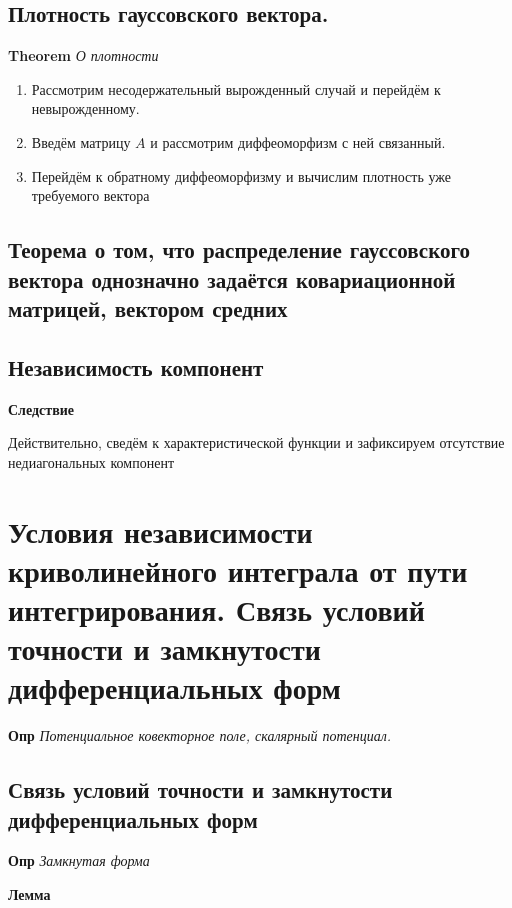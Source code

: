 \documentclass[a4paper, 14pt]{article}
\begin{document}
    \subsection{Плотность гауссовского вектора.}
    
    \textbf{Theorem} \textit{О плотности}
    
    \begin{enumerate}
        \item Рассмотрим несодержательный вырожденный случай и перейдём к невырожденному.
        \item Введём матрицу $A$ и рассмотрим диффеоморфизм с ней связанный.
        \item Перейдём к обратному диффеоморфизму и вычислим плотность уже требуемого вектора
    \end{enumerate}
    
    \subsection{Теорема о том, что распределение гауссовского вектора однозначно задаётся ковариационной матрицей,
        вектором средних}
    
    \subsection{Независимость компонент}
    
    \textbf{Следствие}
    
    Действительно, сведём к характеристической функции и зафиксируем отсутствие недиагональных компонент
    
    \section{Условия независимости криволинейного интеграла от пути интегрирования.
    Связь условий точности и замкнутости дифференциальных форм}
    
    \textbf{Опр} \textit{Потенциальное ковекторное поле, скалярный потенциал.}
    
    \subsection{Связь условий точности и замкнутости дифференциальных форм}
    
    \textbf{Опр} \textit{Замкнутая форма}
    
    \textbf{Лемма}
    
\end{document}
